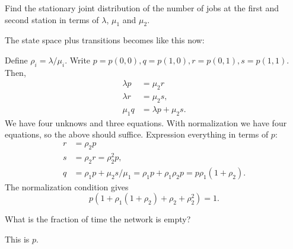 \begin{exercise}[201706]{2}
  Find the stationary joint distribution of the number of jobs at the first
  and second station in terms of $\lambda$, $\mu_1$ and $\mu_2$.
\begin{solution}
The state space plus transitions becomes like this now:



Define $\rho_i=\lambda/\mu_i$. Write $p=p(0,0), q=p(1,0), r=p(0,1), s=p(1,1)$. Then,
  \begin{align*}
     \lambda p &= \mu_2 r \\
     \lambda r &= \mu_2 s,\\
     \mu_1 q &= \lambda p + \mu_2 s.
  \end{align*}
We have four unknows and three equations. With normalization we have four equations, so the above should  suffice.  Expression everything in terms of $p$: 
  \begin{align*}
     r &= \rho_2 p \\
     s &= \rho_2 r = \rho_2^2 p,\\
     q &= \rho_1 p + \mu_2 s/\mu_1 = \rho_1 p + \rho_1\rho_2 p = p \rho_1 (1+\rho_2).
  \end{align*}
The normalization condition gives
\begin{equation*}
  p(1+\rho_1(1+\rho_2) + \rho_2 + \rho_2^2) = 1.
\end{equation*}

\end{solution}
\end{exercise}

\begin{exercise}[201706]
What is the fraction of time the network is empty? %
\begin{solution}
This is $p$. 
\end{solution}
\end{exercise}

